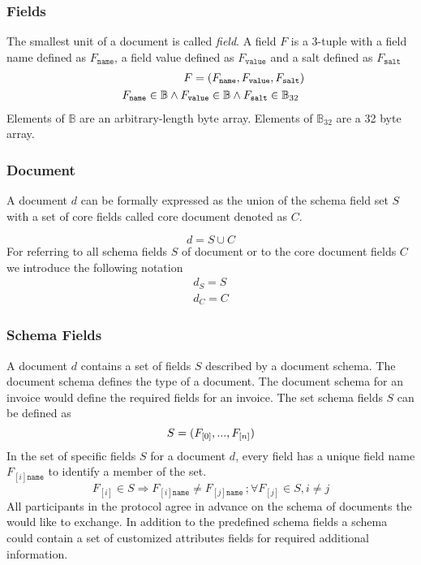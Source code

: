 \subsubsection{Fields}
The smallest unit of a document is called \textit{field}.  
A field $F$ is a 3-tuple  with a field name defined as $F_\texttt{name}$, a field value defined as $F_\texttt{value}$ and a salt defined as $F_\texttt{salt}$
\begin{eqnarray}
F = (F_\texttt{name},F_\texttt{value},F_\texttt{salt}) \\
\begin{array}[t]{lclclc}
F_{\texttt{name}} \in \mathbb{B} \wedge F_{\texttt{value}} \in \mathbb{B} \wedge  F_{\texttt{salt}} \in \mathbb{B}_{32} \\
\end{array}
\end{eqnarray}
Elements of $\mathbb{B}$ are an arbitrary-length byte array. Elements of $\mathbb{B}_{32}$ are a 32 byte array. 

\subsubsection{Document}
A document $d$  can be formally expressed as the union of the schema field set $S$ with a set of core fields called core document denoted as $C$.



\begin{equation}
d = S \cup  C
\end{equation}
For referring to all schema fields $S$ of document or to the core document fields $C$ we introduce the following notation
\begin{eqnarray}
d_S = S \\
d_C = C
\end{eqnarray}

\subsubsection{Schema Fields}\label{sec:doc_schema_fields}
A document $d$ contains a set of fields $S$ described by a document schema. The document schema defines the type of a document. The document schema for an invoice would define the required fields for an invoice.
The set schema fields $S$ can be defined as
\begin{equation}
S = (F_{[0]},...,F_{[n]})\\
\end{equation}
In the set of specific fields $S$ for a document $d$, every field has a unique field name $F_{[i]\texttt{name}}$ to identify a member of the set.
\begin{equation}
F_{[i]} \in  S \Rightarrow F_{[i]\texttt{name}} \neq  F_{[j]\texttt{name}} \, ; \forall F_{[j]}  \in S, i \neq j 
\end{equation}
All participants in the protocol agree in advance on the schema of documents the would like to exchange. In addition to the predefined schema fields a schema could contain a set of customized attributes fields for required additional information.


